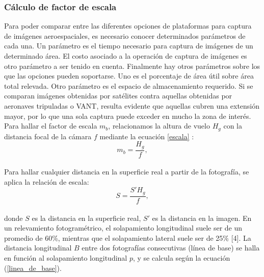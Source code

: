 \subsubsection{Cálculo de factor de escala}
Para poder comparar entre las diferentes opciones de plataformas para captura de imágenes aeroespaciales, es necesario conocer determinados parámetros de cada una. Un parámetro es el tiempo necesario para captura de imágenes de un determinado área. El costo asociado a la operación de captura de imágenes es otro parámetro a ser tenido en cuenta. Finalmente hay otros parámetros sobre los que las opciones pueden soportarse. Uno es el porcentaje de área útil sobre área total relevada. Otro parámetro es el espacio de almacenamiento requerido.
Si se comparan imágenes obtenidas por satélites contra aquellas obtenidas por aeronaves tripuladas o VANT, resulta evidente que aquellas cubren una extensión mayor, por lo que una sola captura puede exceder en mucho la zona de interés. 
Para hallar el factor de escala $m_b$, relacionamos la altura de vuelo $H_g$ con la distancia focal
de la cámara $f$ mediante la ecuación \ref{escala} \cite{linder_digital_2016}:
\\
\begin{equation}
	m_b=\frac{H_g}{f},\label{escala}
\end{equation}
\\
Para hallar cualquier distancia en la superficie real a partir de la fotografía, se aplica la relación de escala:
\\
\begin{equation}
	S=\frac{S'H_g}{f},\label{escala1}
\end{equation}
\\
donde $S$ es la distancia en la superficie real, $S'$ es la distancia en la imagen.
En un relevamiento fotogramétrico, el solapamiento longitudinal suele ser de un promedio de 60\%, mientras que el solapamiento lateral suele ser de 25\% [4]. La distancia longitudinal $B$ entre dos fotografías consecutivas (línea de base) se halla en función al solapamiento longitudinal $p$, y se calcula según la ecuación (\ref{linea_de_base}).
